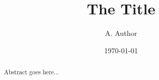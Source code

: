 \documentclass{article}
\title{The Title}
\author{A. Author}
\date{\today}
\begin{document}
\maketitle

\begin{abstract}
Abstract goes here...
\end{abstract}
\end{document}
